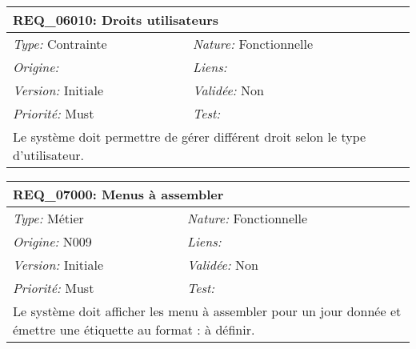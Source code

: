 \begin{table}[!ht]

\begin{tabular}{|p{60mm}p{100mm}|}

\hline

\multicolumn{2}{|l|}{\textbf{REQ\_06010:} Droits utilisateurs} \\ \hline

\emph{Type:} Contrainte & \emph{Nature:} Fonctionnelle \\

\emph{Origine:}  & \emph{Liens:}  \\

\emph{Version:} Initiale & \emph{Validée:} Non \\

\emph{Priorité:} Must & \emph{Test:} \\ \hline

\multicolumn{2}{|p{16cm}|}{Le système doit permettre de gérer différent droit selon le type d'utilisateur.} \\ \hline

\end{tabular}

\end{table}



\begin{table}[!ht]

\begin{tabular}{|p{60mm}p{100mm}|}

\hline

\multicolumn{2}{|l|}{\textbf{REQ\_07000:} Menus à assembler} \\ \hline

\emph{Type:} Métier & \emph{Nature:} Fonctionnelle \\

\emph{Origine:} N009 & \emph{Liens:}  \\

\emph{Version:} Initiale & \emph{Validée:} Non \\

\emph{Priorité:} Must & \emph{Test:} \\ \hline

\multicolumn{2}{|p{16cm}|}{Le système doit afficher les menu à assembler pour un jour donnée et émettre une étiquette au format : à définir.} \\ \hline

\end{tabular}

\end{table}



